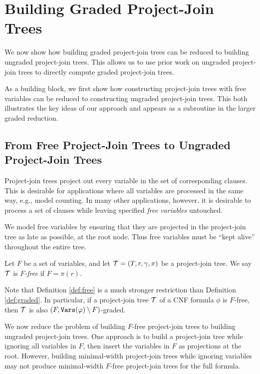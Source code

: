 \section{Building Graded Project-Join Trees}

We now show how building graded project-join trees can be reduced to building ungraded project-join trees. 
This allows us to use prior work on ungraded project-join trees \cite{dudek2020dpmc} to directly compute graded project-join trees.

As a building block, we first show how constructing project-join trees with free variables can be reduced to constructing ungraded project-join trees. This both illustrates the key ideas of our approach and appears as a subroutine in the larger graded reduction.

\subsection{From Free Project-Join Trees to Ungraded Project-Join Trees}
\label{sec:planning:free}
Project-join trees project out every variable in the set of corresponding clauses. This is desirable for applications where all variables are processed in the same way, e.g., model counting. In many other applications, however, it is desirable to process a set of clauses while leaving specified \emph{free variables} untouched. 
 
We model free variables by ensuring that they are projected in the project-join tree as late as possible, at the root node. Thus free variables must be ``kept alive'' throughout the entire tree.
\begin{definition}
\label{def:free}
Let $F$ be a set of variables, and let $\mathcal{T} = (T, r, \gamma, \pi)$ be a project-join tree. We say $\mathcal{T}$ is \emph{$F$-free} if $F = \pi(r)$.
\end{definition}

Note that Definition \ref{def:free} is a much stronger restriction than Definition \ref{def:graded}. 
In particular, if a project-join tree $\mathcal{T}$ of a CNF formula $\phi$ is $F$-free, then $\mathcal{T}$ is also $(F, \texttt{\upshape Vars}(\varphi) \setminus F)$-graded.

We now reduce the problem of building $F$-free project-join trees to building ungraded project-join trees. One approach is to build a project-join tree while ignoring all variables in $F$, then insert the variables in $F$ as projections at the root. 
However, building minimal-width project-join trees while ignoring variables may not produce minimal-width $F$-free project-join trees for the full formula.

